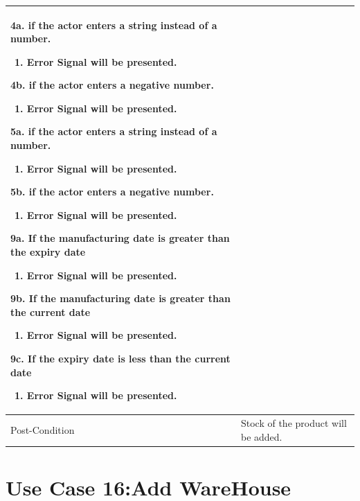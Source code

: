 \documentclass[12pt,a4paper]{article}
\begin{document}
\begin{longtable}{| p{3cm}|p{12cm}|}
4a. if the actor enters a string instead of a number.
 	\begin{enumerate}
		\item Error Signal will be presented.
	\end{enumerate}
4b. if the actor enters a negative number.
 	\begin{enumerate}
		\item Error Signal will be presented.
	\end{enumerate}
5a. if the actor enters a string instead of a number.
 	\begin{enumerate}
		\item Error Signal will be presented.
	\end{enumerate}
5b. if the actor enters a negative number.
 	\begin{enumerate}
		\item Error Signal will be presented.
	\end{enumerate}
9a. If the manufacturing date is greater than the expiry date
	\begin{enumerate}
		\item Error Signal will be presented.
	\end{enumerate}
9b. If the manufacturing date is greater than the current date
	\begin{enumerate}
		\item Error Signal will be presented.
	\end{enumerate}
9c. If the expiry date is less than the current date
	\begin{enumerate}
		\item Error Signal will be presented.
	\end{enumerate}
\\ \hline
Post-Condition &  Stock of the product will be added. \\ \hline
\end{longtable}
\section*{Use Case 16:Add WareHouse}
\end{document}
